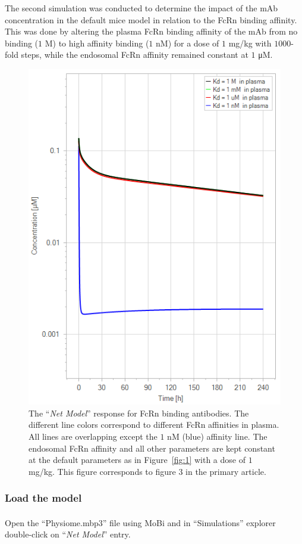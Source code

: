 \documentclass[fleqn,10pt]{physiome}
\begin{document}
The second simulation was conducted to determine the impact of the mAb concentration in the default mice model in relation to the FcRn binding affinity. This was done by altering the plasma FcRn binding affinity of the mAb from no binding ($1$ M) to high affinity binding ($1$ nM) for a dose of $1$ mg/kg with $1000$-fold steps, while the endosomal FcRn affinity remained constant at $1$ \si{\micro M}.

\begin{figure}[htb]\centering
    \includegraphics[width=0.49\linewidth]{pl3}
    \caption{The ``\textit{Net Model}'' response for FcRn binding antibodies. The different line colors correspond to different FcRn affinities in plasma. All lines are overlapping except the $1$ nM (blue) affinity line. The endosomal FcRn affinity and all other parameters are kept constant at the default parameters as in Figure~\ref{fig:1} with a dose of $1$ mg/kg. This figure corresponds to figure 3 in the primary article.}
    \label{fig:2}
\end{figure}

\subsubsection{Load the model}
Open the ``Physiome.mbp3'' file using MoBi\textsuperscript{\textregistered} and in ``Simulations'' explorer double-click on ``\textit{Net Model}'' entry.
\end{document}
